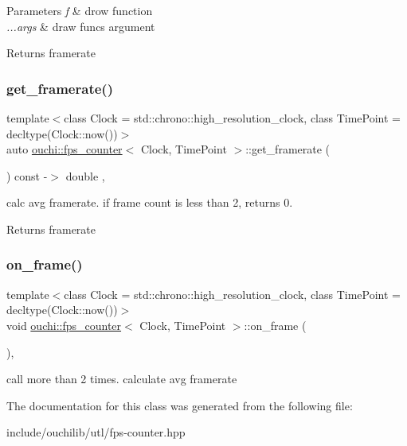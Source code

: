 \begin{DoxyParams}{Parameters}
{\em f} & drow function\\
\hline
{\em ...\+args} & draw func\textquotesingle{}s argument\\
\hline
\end{DoxyParams}
\begin{DoxyReturn}{Returns}
framerate
\end{DoxyReturn}
\mbox{\label{classouchi_1_1fps__counter_a79b6ffdb6f8d8ef73f019f704e4ed901}} 
\subsubsection{\texorpdfstring{get\_framerate()}{get\_framerate()}}
{\footnotesize\ttfamily template$<$class Clock = std\+::chrono\+::high\+\_\+resolution\+\_\+clock, class Time\+Point = decltype(\+Clock\+::now())$>$ \\
auto \mbox{\hyperlink{classouchi_1_1fps__counter}{ouchi\+::fps\+\_\+counter}}$<$ Clock, Time\+Point $>$\+::get\+\_\+framerate (\begin{DoxyParamCaption}{ }\end{DoxyParamCaption}) const -\/$>$ double \hspace{0.3cm}{\ttfamily [inline]}, {\ttfamily [noexcept]}}



calc avg framerate. if frame count is less than 2, returns 0. 

\begin{DoxyReturn}{Returns}
framerate
\end{DoxyReturn}
\mbox{\label{classouchi_1_1fps__counter_a0a7766cd31f0ed5d07bfcb316244673f}} 
\subsubsection{\texorpdfstring{on\_frame()}{on\_frame()}}
{\footnotesize\ttfamily template$<$class Clock = std\+::chrono\+::high\+\_\+resolution\+\_\+clock, class Time\+Point = decltype(\+Clock\+::now())$>$ \\
void \mbox{\hyperlink{classouchi_1_1fps__counter}{ouchi\+::fps\+\_\+counter}}$<$ Clock, Time\+Point $>$\+::on\+\_\+frame (\begin{DoxyParamCaption}{ }\end{DoxyParamCaption})\hspace{0.3cm}{\ttfamily [inline]}, {\ttfamily [noexcept]}}



call more than 2 times. calculate avg framerate 



The documentation for this class was generated from the following file\+:\begin{DoxyCompactItemize}
\item 
include/ouchilib/utl/fps-\/counter.\+hpp\end{DoxyCompactItemize}
